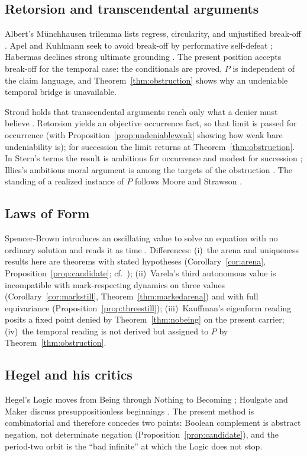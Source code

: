 \documentclass[11pt]{article}
\begin{document}
\subsection{Retorsion and transcendental arguments}
Albert's Münchhausen trilemma lists regress, circularity, and unjustified break-off \cite{albert1985}. Apel and Kuhlmann seek to avoid break-off by performative self-defeat \cite{apel1980,kuhlmann1985}; Habermas declines strong ultimate grounding \cite{habermas1990}. The present position accepts break-off for the temporal case: the conditionals are proved, $P$ is independent of the claim language, and Theorem~\ref{thm:obstruction} shows why an undeniable temporal bridge is unavailable.

Stroud holds that transcendental arguments reach only what a denier must believe \cite{stroud1968}. Retorsion yields an objective occurrence fact, so that limit is passed for occurrence (with Proposition~\ref{prop:undeniableweak} showing how weak bare undeniability is); for succession the limit returns at Theorem~\ref{thm:obstruction}. In Stern's terms the result is ambitious for occurrence and modest for succession \cite{stern2000}; Illies's ambitious moral argument is among the targets of the obstruction \cite{illies2003}. The standing of a realized instance of $P$ follows Moore and Strawson \cite{moore1925,strawson1985}.

\subsection{Laws of Form}
\label{sec:lof}
Spencer-Brown introduces an oscillating value to solve an equation with no ordinary solution and reads it as time \cite{spencerbrown1969}. Differences: (i)~the arena and uniqueness results here are theorems with stated hypotheses (Corollary~\ref{cor:arena}, Proposition~\ref{prop:candidate}; cf.\ \cite{cullfrank1979}); (ii)~Varela's third autonomous value \cite{varela1975} is incompatible with mark-respecting dynamics on three values (Corollary~\ref{cor:markstill}, Theorem~\ref{thm:markedarena}) and with full equivariance (Proposition~\ref{prop:threestill}); (iii)~Kauffman's eigenform reading \cite{kauffman1987,kauffmanvarela1980} posits a fixed point denied by Theorem~\ref{thm:nobeing} on the present carrier; (iv)~the temporal reading is not derived but assigned to $P$ by Theorem~\ref{thm:obstruction}.

\subsection{Hegel and his critics}
\label{sec:hegel}
Hegel's Logic moves from Being through Nothing to Becoming \cite{hegel1832}; Houlgate and Maker discuss presuppositionless beginnings \cite{houlgate2006,maker1994}. The present method is combinatorial and therefore concedes two points: Boolean complement is abstract negation, not determinate negation (Proposition~\ref{prop:candidate}), and the period-two orbit is the ``bad infinite'' at which the Logic does not stop.
\end{document}

